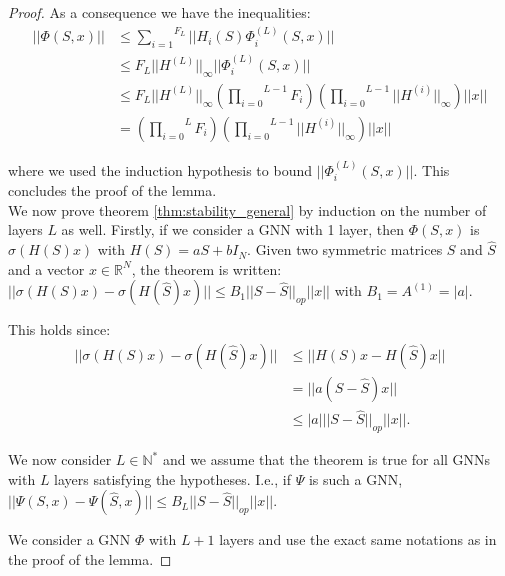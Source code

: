 \documentclass[11pt,a4paper]{article}
\newcommand{\op}[1]{|| #1 ||_{op}}
\newcommand{\ninf}[1]{|| #1 ||_\infty}
\newcommand{\Sum}[2]{\overset{#2}{\underset{#1}{\sum}}}
\newcommand{\Prod}[2]{\overset{#2}{\underset{#1}{\prod}}}
\theoremstyle{definition}
\renewcommand{\leq}{\leqslant}
\begin{document}
\begin{proof}
            As a consequence we have the inequalities:
            \begin{align*}
                ||\Phi(S,x)|| &\leq \Sum{i=1}{F_L} ||H_i(S) \Phi^{(L)}_i(S,x) || \\
                &\leq F_L \ninf{H^{(L)}} || \Phi^{(L)}_i(S,x) || \\
                &\leq F_L \ninf{H^{(L)}} \left( \Prod{i=0}{L-1} F_i \right) \left( \Prod{i=0}{L-1} \ninf{H^{(i)}} \right) ||x|| \\
                &= \left( \Prod{i=0}{L} F_i \right) \left( \Prod{i=0}{L-1} \ninf{H^{(i)}} \right) ||x||
            \end{align*}

            where we used the induction hypothesis to bound $|| \Phi^{(L)}_i(S,x) ||$. This concludes the proof of the lemma.\\
        
            We now prove theorem \ref{thm:stability_general} by induction on the number of layers $L$ as well.
            Firstly, if we consider a GNN with 1 layer, then $\Phi(S,x)$ is $\sigma(H(S)x)$ with $H(S) = aS + b I_N$. Given two symmetric matrices $S$ and $\hat{S}$ and a vector $x \in \mathbb{R}^N$, the theorem is written:
                $|| \sigma(H(S)x) - \sigma(H(\hat{S})x) || \leq B_1 \op{S - \hat{S}} ||x||$ with $B_1 = A^{(1)} = |a|$.

                This holds since:
                \begin{align*}
                    || \sigma(H(S)x) - \sigma(H(\hat{S})x) || &\leq || H(S)x - H(\hat{S})x || \\
                    &= || a (S - \hat{S}) x|| \\
                    &\leq |a| \op{S - \hat{S}} ||x||.
                \end{align*}
            
            We now consider $L \in \mathbb{N}^*$ and we assume that the theorem is true for all GNNs with $L$ layers satisfying the hypotheses. I.e., if $\Psi$ is such a GNN, $|| \Psi (S,x) - \Psi (\hat{S},x) || \leq B_L \op{S - \hat{S}} ||x||.$

            We consider a GNN $\Phi$ with $L+1$ layers and use the exact same notations as in the proof of the lemma.



\end{proof}
\end{document}
